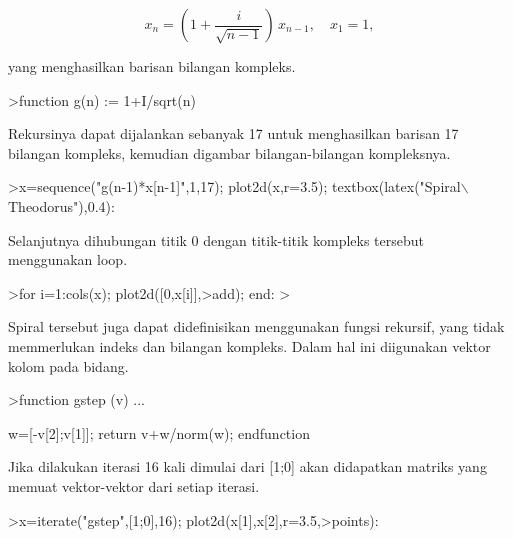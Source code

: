 \documentclass[a4paper,10pt]{article}
\begin{document}
\begin{eulernotebook}
\begin{eulercomment}
\begin{eulercomment}
\begin{eulercomment}
\begin{eulercomment}
\begin{eulercomment}
\begin{eulercomment}
\begin{eulercomment}
\begin{eulercomment}
\begin{eulercomment}
\begin{eulercomment}
\begin{eulercomment}
\begin{eulercomment}
\begin{eulercomment}
\begin{eulercomment}
\begin{eulercomment}
\begin{eulercomment}
\begin{eulercomment}
\end{eulercomment}
\begin{eulerformula}
\[
x_n = \left( 1 + \frac{i}{\sqrt{n-1}} \right) \, x_{n-1}, \quad x_1=1,
\]
\end{eulerformula}
\begin{eulercomment}
yang menghasilkan barisan bilangan kompleks.
\end{eulercomment}
\begin{eulerprompt}
>function g(n) := 1+I/sqrt(n)
\end{eulerprompt}
\begin{eulercomment}
Rekursinya dapat dijalankan sebanyak 17 untuk menghasilkan barisan 17 bilangan kompleks,
kemudian digambar bilangan-bilangan kompleksnya.
\end{eulercomment}
\begin{eulerprompt}
>x=sequence("g(n-1)*x[n-1]",1,17); plot2d(x,r=3.5); textbox(latex("Spiral\(\backslash\) Theodorus"),0.4):
\end{eulerprompt}
\begin{eulercomment}
Selanjutnya dihubungan titik 0 dengan titik-titik kompleks tersebut menggunakan loop.
\end{eulercomment}
\begin{eulerprompt}
>for i=1:cols(x); plot2d([0,x[i]],>add); end:
> 
\end{eulerprompt}
\begin{eulercomment}
Spiral tersebut juga dapat didefinisikan menggunakan fungsi rekursif, yang tidak memmerlukan
indeks dan bilangan kompleks. Dalam hal ini diigunakan vektor kolom pada bidang.
\end{eulercomment}
\begin{eulerprompt}
>function gstep (v) ...
\end{eulerprompt}
\begin{eulerudf}
  w=[-v[2];v[1]];
  return v+w/norm(w);
  endfunction
\end{eulerudf}
\begin{eulercomment}
Jika dilakukan iterasi 16 kali dimulai dari [1;0] akan didapatkan matriks yang memuat
vektor-vektor dari setiap iterasi.
\end{eulercomment}
\begin{eulerprompt}
>x=iterate("gstep",[1;0],16); plot2d(x[1],x[2],r=3.5,>points):
\end{eulerprompt}
\begin{eulercomment}
\begin{eulercomment}

\end{eulercomment}
\end{eulercomment}
\end{eulercomment}
\end{eulercomment}
\end{eulercomment}
\end{eulercomment}
\end{eulercomment}
\end{eulercomment}
\end{eulercomment}
\end{eulercomment}
\end{eulercomment}
\end{eulercomment}
\end{eulercomment}
\end{eulercomment}
\end{eulercomment}
\end{eulercomment}
\end{eulercomment}
\end{eulercomment}
\end{eulernotebook}
\end{document}
